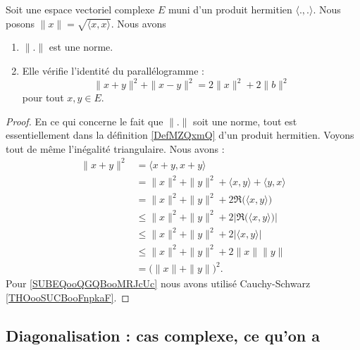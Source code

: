 \begin{proposition}       \label{PROPooSSYJooHAXAnC}
    Soit une espace vectoriel complexe \( E\) muni d'un produit hermitien \( \langle ., .\rangle \). Nous posons \( \| x \|=\sqrt{ \langle x, x\rangle  }\). Nous avons
    \begin{enumerate}
        \item
            \( \| . \|\) est une norme.
        \item
            Elle vérifie l'identité du parallélogramme :
            \begin{equation}
                \| x+y \|^2+\| x-y \|^2=2\| x \|^2+2\| b \|^2
            \end{equation}
            pour tout \( x,y\in E\).
    \end{enumerate}
\end{proposition}

\begin{proof}
    En ce qui concerne le fait que \( \| . \|\) soit une norme, tout est essentiellement dans la définition \ref{DefMZQxmQ} d'un produit hermitien. Voyons tout de même l'inégalité triangulaire. Nous avons :
    \begin{subequations}
        \begin{align}
            \| x+y \|^2&=\langle x+y, x+y\rangle\\
            &=\| x \|^2+\| y \|^2+\langle x, y\rangle +\langle y, x\rangle\\
            &=\| x \|^2+\| y \|^2+2\Re\big( \langle x, y\rangle  \big)\\
            &\leq\| x \|^2+\| y \|^2+2|\Re\big( \langle x, y\rangle  \big)|\\
            &\leq\| x \|^2+\| y \|^2+2| \langle x, y\rangle  |\\
            &\leq \| x \|^2+\| y \|^2+2\| x \|\| y \|\label{SUBEQooQGQBooMRJcUc}\\
            &=\big( \| x \|+\| y \| \big)^2.
        \end{align}
    \end{subequations}
    Pour \eqref{SUBEQooQGQBooMRJcUc} nous avons utilisé Cauchy-Schwarz \ref{THOooSUCBooFnpkaF}.
\end{proof}

\subsection{Diagonalisation : cas complexe, ce qu'on a}

